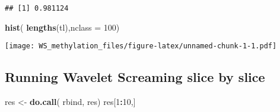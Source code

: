 \documentclass[
]{article}
\newenvironment{Shaded}{\begin{snugshade}}{\end{snugshade}}
\newcommand{\DataTypeTok}[1]{\textcolor[rgb]{0.13,0.29,0.53}{#1}}
\newcommand{\DecValTok}[1]{\textcolor[rgb]{0.00,0.00,0.81}{#1}}
\newcommand{\KeywordTok}[1]{\textcolor[rgb]{0.13,0.29,0.53}{\textbf{#1}}}
\newcommand{\NormalTok}[1]{#1}
\newcommand{\OperatorTok}[1]{\textcolor[rgb]{0.81,0.36,0.00}{\textbf{#1}}}
\newcommand{\StringTok}[1]{\textcolor[rgb]{0.31,0.60,0.02}{#1}}
\begin{document}
\begin{verbatim}
## [1] 0.981124
\end{verbatim}

\begin{Shaded}
\begin{Highlighting}[]
\KeywordTok{hist}\NormalTok{( }\KeywordTok{lengths}\NormalTok{(tl),}\DataTypeTok{nclass =} \DecValTok{100}\NormalTok{)}
\end{Highlighting}
\end{Shaded}

\texttt{[image: WS\_methylation\_files/figure-latex/unnamed-chunk-1-1.pdf]}

\hypertarget{running-wavelet-screaming-slice-by-slice}{%
\subsection{Running Wavelet Screaming slice by
slice}\label{running-wavelet-screaming-slice-by-slice}}

\begin{Shaded}
\begin{Highlighting}[]
\NormalTok{res <-}\StringTok{ }\KeywordTok{do.call}\NormalTok{( rbind, res)}
\NormalTok{res[}\DecValTok{1}\OperatorTok{:}\DecValTok{10}\NormalTok{,]}
\end{Highlighting}
\end{Shaded}
\end{document}

